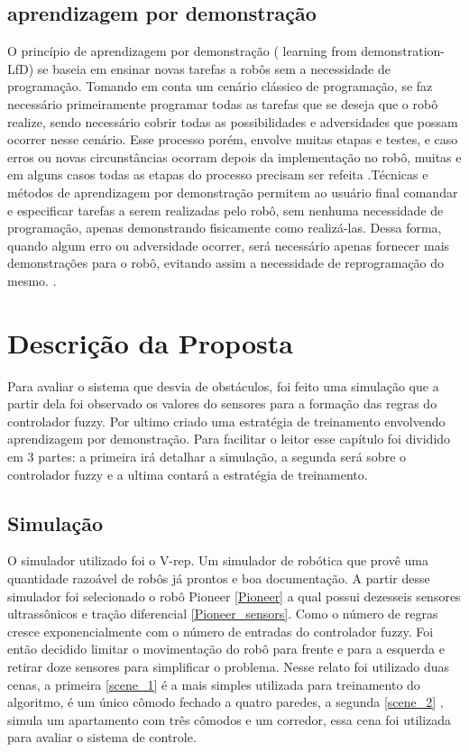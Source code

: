 \documentclass[
	12pt,				%
	openright,			%
	oneside,			%
	a4paper,			%
	brazil,				%
	]{abntex2}
\begin{document}
\section{aprendizagem por demonstração}
O princípio de aprendizagem por demonstração ( learning from demonstration- LfD) se baseia em ensinar novas tarefas a robôs sem a necessidade de programação. Tomando em conta um cenário clássico de programação, se faz necessário primeiramente programar todas as tarefas que se deseja que o robô realize, sendo necessário cobrir todas as possibilidades e adversidades que possam ocorrer nesse cenário. Esse processo porém, envolve muitas etapas e testes, e caso erros ou novas circunstâncias ocorram depois da implementação no robô, muitas e em alguns casos todas as etapas do processo precisam ser refeita \cite{ekvall2008robot}.Técnicas e métodos de aprendizagem por demonstração permitem ao usuário final comandar e especificar tarefas a serem realizadas pelo robô, sem nenhuma necessidade de programação, apenas demonstrando fisicamente como realizá-las. Dessa forma, quando algum erro ou adversidade ocorrer, será necessário apenas fornecer mais demonstrações para o robô, evitando assim a necessidade de reprogramação do mesmo. \cite{motta2016aprendizagem}.


\chapter{Descrição da Proposta}\label{Descricao}
Para avaliar o sistema que desvia de obstáculos, foi feito uma simulação que a partir dela foi observado os valores do sensores para a formação das regras do controlador fuzzy. Por ultimo criado uma estratégia de treinamento envolvendo aprendizagem por demonstração. Para facilitar o leitor esse capítulo foi dividido em 3 partes: a primeira irá detalhar a simulação, a segunda será sobre o controlador fuzzy e a ultima contará a estratégia de treinamento. 

\section{Simulação}
O simulador utilizado foi o V-rep. Um simulador de robótica que provê uma quantidade razoável de robôs já prontos e boa documentação. A partir desse simulador foi selecionado o robô Pioneer \ref{Pioneer} a qual possui dezesseis sensores ultrassônicos e tração diferencial \ref{Pioneer_sensors}. Como o número de regras cresce exponencialmente com o número de entradas do controlador fuzzy. Foi então decidido limitar o movimentação do robô para frente e para a esquerda e retirar doze sensores para simplificar o problema. Nesse relato foi utilizado duas cenas, a primeira \ref{scene_1} é a mais simples utilizada para treinamento do algoritmo, é um único cômodo fechado a quatro paredes, a segunda \ref{scene_2} , simula um apartamento com três cômodos e um corredor, essa cena foi utilizada para avaliar o sistema de controle.
\end{document}
